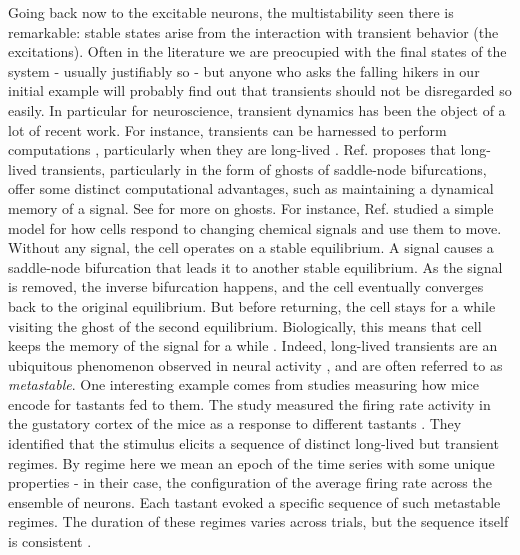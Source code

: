Going back now to the excitable neurons, the multistability seen there is remarkable: stable states arise from the interaction with transient behavior (the excitations). Often in the literature we are preocupied with the final states of the system - usually justifiably so - but anyone who asks the falling hikers in our initial example will probably find out that transients should not be disregarded so easily. In particular for neuroscience, transient dynamics has been the object of a lot of recent work. For instance, transients can be harnessed to perform computations \cite{budzinski2023an}, particularly when they are long-lived \cite{koch2024biological}. Ref. \cite{koch2024biological} proposes that long-lived transients, particularly in the form of ghosts of saddle-node bifurcations, offer some distinct computational advantages, such as maintaining a dynamical memory of a signal. See  for more on ghosts. For instance, Ref. \cite{nandan2022cells} studied a simple model for how cells respond to changing chemical signals and use them to move. Without any signal, the cell operates on a stable equilibrium. A signal causes a saddle-node bifurcation that leads it to another stable equilibrium. As the signal is removed, the inverse bifurcation happens, and the cell eventually converges back to the original equilibrium. But before returning, the cell stays for a while visiting the ghost of the second equilibrium. Biologically, this means that cell keeps the memory of the signal for a while \cite{nandan2022cells, koch2024biological}. 
Indeed, long-lived transients are an ubiquitous phenomenon observed in neural activity \cite{tognoli2014metastable, brinkman2022metastable}, and are often referred to as \textit{metastable}. One interesting example comes from studies measuring how mice encode for tastants fed to them. The study measured the firing rate activity in the gustatory cortex of the mice as a response to different tastants \cite{jones2007natural}. They identified that the stimulus elicits a sequence of distinct long-lived but transient regimes. By regime here we mean an epoch of the time series with some unique properties - in their case, the configuration of the average firing rate across the ensemble of neurons. Each tastant evoked a specific sequence of such metastable regimes. The duration of these regimes varies across trials, but the sequence itself is consistent \cite{lacamera2019cortical, brinkman2022metastable}.

